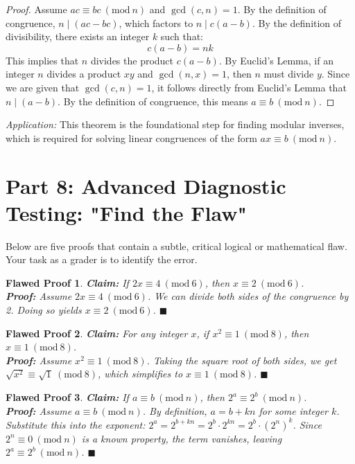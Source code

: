 \documentclass[11pt]{article}
\newtheorem{flaw}{Flawed Proof}
\newcommand{\modulo}[1]{\ (\mathrm{mod}\ #1)}
\begin{document}
\begin{proof}
Assume $ac \equiv bc \modulo{n}$ and $\gcd(c, n) = 1$.
By the definition of congruence, $n \mid (ac - bc)$, which factors to $n \mid c(a - b)$.
By the definition of divisibility, there exists an integer $k$ such that:
\[ c(a - b) = nk \]
This implies that $n$ divides the product $c(a - b)$. 
By Euclid's Lemma, if an integer $n$ divides a product $xy$ and $\gcd(n, x) = 1$, then $n$ must divide $y$.
Since we are given that $\gcd(c, n) = 1$, it follows directly from Euclid's Lemma that $n \mid (a - b)$.
By the definition of congruence, this means $a \equiv b \modulo{n}$.
\end{proof}
\textit{Application:} This theorem is the foundational step for finding modular inverses, which is required for solving linear congruences of the form $ax \equiv b \modulo{n}$.

\newpage
\section{Part 8: Advanced Diagnostic Testing: "Find the Flaw"}

Below are five proofs that contain a subtle, critical logical or mathematical flaw. Your task as a grader is to identify the error.

\begin{flaw}
\textbf{Claim:} If $2x \equiv 4 \modulo{6}$, then $x \equiv 2 \modulo{6}$. \\
\textbf{Proof:} Assume $2x \equiv 4 \modulo{6}$. We can divide both sides of the congruence by 2. Doing so yields $x \equiv 2 \modulo{6}$. $\blacksquare$
\end{flaw}

\begin{flaw}
\textbf{Claim:} For any integer $x$, if $x^2 \equiv 1 \modulo{8}$, then $x \equiv 1 \modulo{8}$. \\
\textbf{Proof:} Assume $x^2 \equiv 1 \modulo{8}$. Taking the square root of both sides, we get $\sqrt{x^2} \equiv \sqrt{1} \modulo{8}$, which simplifies to $x \equiv 1 \modulo{8}$. $\blacksquare$
\end{flaw}

\begin{flaw}
\textbf{Claim:} If $a \equiv b \modulo{n}$, then $2^a \equiv 2^b \modulo{n}$. \\
\textbf{Proof:} Assume $a \equiv b \modulo{n}$. By definition, $a = b + kn$ for some integer $k$. Substitute this into the exponent: $2^a = 2^{b+kn} = 2^b \cdot 2^{kn} = 2^b \cdot (2^n)^k$. Since $2^n \equiv 0 \modulo{n}$ is a known property, the term vanishes, leaving $2^a \equiv 2^b \modulo{n}$. $\blacksquare$
\end{flaw}
\end{document}
